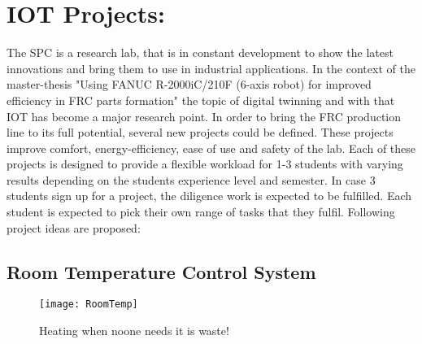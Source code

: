\newpage
\chapter{IOT Projects:}

The \ac{SPC} is a research lab, that is in constant development to show the latest innovations and bring them to use in industrial applications.
In the context of the master-thesis "Using FANUC R-2000iC/210F (6-axis robot) for improved efficiency in FRC parts formation" the topic of digital twinning and with that \ac{IOT} has become a major research point. 
In order to bring the \ac{FRC} production line to its full potential, several new projects could be defined. 
These projects improve comfort, energy-efficiency, ease of use and safety of the lab.
Each of these projects is designed to provide a flexible workload for 1-3 students with varying results depending on the students experience level and semester. In case 3 students sign up for a project, the diligence work is expected to be fulfilled. Each student is expected to pick their own range of tasks that they fulfil.
Following project ideas are proposed:\\
\bigskip
%
\section*{Room Temperature Control System}

	\begin{figure}[H]
	\centering
	\texttt{[image: RoomTemp]}
	\caption{Heating when noone needs it is waste! \cite{RoomTemp}}
	\label{fig: RoomTemp}
\end{figure}


